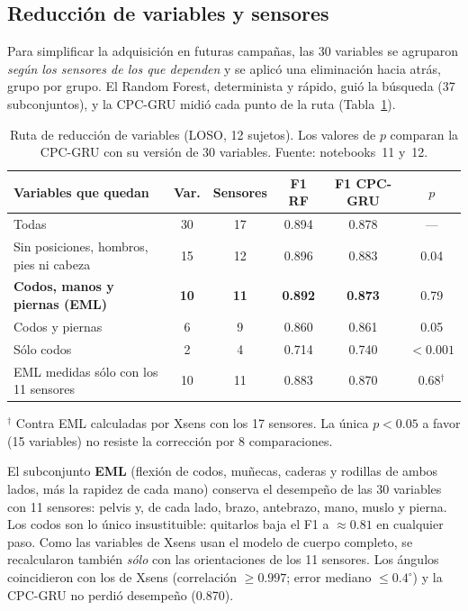 \documentclass[letterpaper,11pt]{article}
\begin{document}
\subsection{Reducción de variables y sensores}
\label{sec:reduccion}
Para simplificar la adquisición en futuras campañas, las 30 variables se agruparon \emph{según los sensores de los que dependen} y se aplicó una eliminación hacia atrás, grupo por grupo. El Random Forest, determinista y rápido, guió la búsqueda (37 subconjuntos), y la CPC-GRU midió cada punto de la ruta (Tabla~\ref{tab:reduccion}).

\begin{table}[H]
  \centering
  \small
  \caption{Ruta de reducción de variables (LOSO, 12 sujetos). Los valores de $p$ comparan la CPC-GRU con su versión de 30 variables. Fuente: notebooks~11 y~12.}
  \label{tab:reduccion}
  \begin{tabular}{lccccc}
    \toprule
    Variables que quedan & Var. & Sensores & F1 RF & F1 CPC-GRU & $p$ \\
    \midrule
    Todas                                          & 30 & 17 & 0.894 & 0.878 & --- \\
    Sin posiciones, hombros, pies ni cabeza & 15 & 12 & 0.896 & 0.883 & 0.04 \\
    \textbf{Codos, manos y piernas (EML)}          & \textbf{10} & \textbf{11} & \textbf{0.892} & \textbf{0.873} & 0.79 \\
    Codos y piernas                                & 6  & 9  & 0.860 & 0.861 & 0.05 \\
    Sólo codos                                     & 2  & 4  & 0.714 & 0.740 & $< 0.001$ \\
    \midrule
    EML medidas sólo con los 11 sensores & 10 & 11 & 0.883 & 0.870 & 0.68$^{\dagger}$ \\
    \bottomrule
  \end{tabular}

  \smallskip
  {\footnotesize $^{\dagger}$ Contra EML calculadas por Xsens con los 17 sensores. La única $p < 0.05$ a favor (15 variables) no resiste la corrección por 8 comparaciones.}
\end{table}

El subconjunto \textbf{EML} (flexión de codos, muñecas, caderas y rodillas de ambos lados, más la rapidez de cada mano) conserva el desempeño de las 30 variables con 11 sensores: pelvis y, de cada lado, brazo, antebrazo, mano, muslo y pierna. Los codos son lo único insustituible: quitarlos baja el F1 a $\approx 0.81$ en cualquier paso. Como las variables de Xsens usan el modelo de cuerpo completo, se recalcularon también \emph{sólo} con las orientaciones de los 11 sensores. Los ángulos coincidieron con los de Xsens (correlación $\ge 0.997$; error mediano $\le 0.4^\circ$) y la CPC-GRU no perdió desempeño (0.870).
\end{document}
